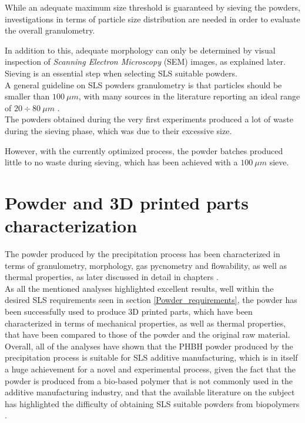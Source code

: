 \documentclass{article}
\begin{document}
    While an adequate maximum size threshold is guaranteed by sieving the powders,
    investigations in terms of particle size distribution are needed in order to evaluate the overall granulometry. 
    
    In addition to this, adequate morphology can only be 
    determined by visual inspection of \textit{Scanning Electron Microscopy} (SEM) images, as explained later. \\

    Sieving is an essential step when selecting SLS suitable powders. \\ 
    A general guideline on SLS powders granulometry is that particles should be smaller than $100 \ \mu m$, with many 
    sources in the literature reporting an ideal range of $20 \div 80 \ \mu m$ \autocites{Padovano_SLS_Review}. \\ 

    The powders obtained during the very first experiments produced a lot of waste during the sieving phase, which was due to their excessive size. 

    However, with the currently optimized process, the powder batches produced little to no waste during sieving, which has been achieved 
    with a $100 \ \mu m$ sieve. \\

    \clearpage

    \section{Powder and 3D printed parts characterization\label{powder_characterization}}

    The powder produced by the precipitation process has been characterized in terms of granulometry, morphology, gas pycnometry and flowability, 
    as well as thermal properties, as later discussed in detail in chapters  . \\

    As all the mentioned analyses highlighted excellent results, well within the desired SLS requirements seen in section \ref{Powder_requirements}, the powder has been successfully 
    used to produce 3D printed parts, which have been characterized in terms of mechanical properties, as well as thermal properties, that have been 
    compared to those of the powder and the original raw material. \\

    Overall, all of the analyses have shown that the PHBH powder produced by the precipitation process is suitable for SLS additive manufacturing, which is in itself a huge achievement for a 
    novel and experimental process, given the fact that the powder is produced from a bio-based polymer that is not commonly used in the additive manufacturing industry, and that 
    the available literature on the subject has highlighted the difficulty of obtaining SLS suitable powders from biopolymers \autocites{Padovano_SLS_Review}. \\ 
\end{document}
